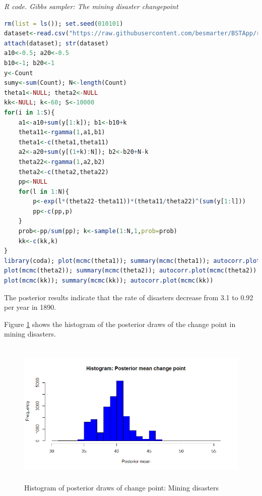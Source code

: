 \begin{tcolorbox}[enhanced,width=4.67in,center upper,
	fontupper=\large\bfseries,drop shadow southwest,sharp corners]
	\textit{R code. Gibbs sampler: The mining disaster changepoint}
	\begin{VF}
		\begin{lstlisting}[language=R]
rm(list = ls()); set.seed(010101)
dataset<-read.csv("https://raw.githubusercontent.com/besmarter/BSTApp/refs/heads/master/DataApp/MiningDataCarlin.csv",header=T)
attach(dataset); str(dataset)
a10<-0.5; a20<-0.5
b10<-1; b20<-1
y<-Count
sumy<-sum(Count); N<-length(Count)
theta1<-NULL; theta2<-NULL
kk<-NULL; k<-60; S<-10000
for(i in 1:S){
	a1<-a10+sum(y[1:k]); b1<-b10+k
	theta11<-rgamma(1,a1,b1)
	theta1<-c(theta1,theta11)
	a2<-a20+sum(y[(1+k):N]); b2<-b20+N-k
	theta22<-rgamma(1,a2,b2)
	theta2<-c(theta2,theta22)
	pp<-NULL
	for(l in 1:N){
		p<-exp(l*(theta22-theta11))*(theta11/theta22)^(sum(y[1:l]))
		pp<-c(pp,p)
	}
	prob<-pp/sum(pp); k<-sample(1:N,1,prob=prob)
	kk<-c(kk,k)
}
library(coda); plot(mcmc(theta1)); summary(mcmc(theta1)); autocorr.plot(mcmc(theta1))
plot(mcmc(theta2)); summary(mcmc(theta2)); autocorr.plot(mcmc(theta2))
plot(mcmc(kk)); summary(mcmc(kk)); autocorr.plot(mcmc(kk))
\end{lstlisting}
	\end{VF}
\end{tcolorbox} 

The posterior results indicate that the rate of disasters decrease from 3.1 to 0.92 per year in 1890. 

Figure \ref{fig52} shows the histogram of the posterior draws of the change point in mining disasters. 

\begin{figure}[!h]
	\includegraphics[width=340pt, height=200pt]{Chapters/chapter5/figures/Mining.png}
	\caption[List of figure caption goes here]{Histogram of posterior draws of change point: Mining disasters}\label{fig52}
\end{figure} 

